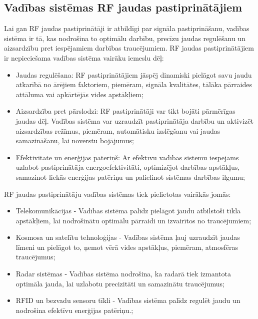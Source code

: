 \subsection{Vadības sistēmas RF jaudas pastiprinātājiem}
Lai gan RF jaudas pastiprinātāji ir atbildīgi par signāla pastiprināšanu, vadības sistēma ir tā, kas nodrošina to optimālu darbību, precīzu jaudas regulēšanu un aizsardzību pret iespējamiem darbības traucējumiem.
RF jaudas pastiprinātājiem ir nepieciešama vadības sistēma vairāku iemeslu dēļ:
\begin{itemize}
    \item Jaudas regulēšana: RF pastiprinātājiem jāspēj dinamiski pielāgot savu jaudu atkarībā no ārējiem faktoriem, piemēram, signāla kvalitātes, tālāka pārraides attāluma vai apkārtējās vides apstākļiem;
    \item Aizsardzība pret pārslodzi: RF pastiprinātāji var tikt bojāti pārmērīgas jaudas dēļ. Vadības sistēma var uzraudzīt pastiprinātāja darbību un aktivizēt aizsardzības režīmus, piemēram, automātisku izslēgšanu vai jaudas samazināšanu, lai novērstu bojājumus;
    \item Efektivitāte un enerģijas patēriņš: Ar efektīvu vadības sistēmu iespējams uzlabot pastiprinātāja energoefektivitāti, optimizējot darbības apstākļus, samazinot liekās enerģijas patēriņu un palielinot sistēmas darbības ilgumu;
\end{itemize}

RF jaudas pastiprinātāju vadības sistēmas tiek pielietotas vairākās jomās:

\begin{itemize}
    \item Telekomunikācijas - Vadības sistēma palīdz pielāgot jaudu atbilstoši tīkla apstākļiem, lai nodrošinātu optimālu pārraidi un izvairītos no traucējumiem;
    \item Kosmosa un satelītu tehnoloģijas - Vadības sistēma ļauj uzraudzīt jaudas līmeni un pielāgot to, ņemot vērā vides apstākļus, piemēram, atmosfēras traucējumus;
    \item Radar sistēmas - Vadības sistēma nodrošina, ka radarā tiek izmantota optimāla jauda, lai uzlabotu precizitāti un samazinātu traucējumus;
    \item RFID un bezvadu sensoru tīkli - Vadības sistēma palīdz regulēt jaudu un nodrošina efektīvu enerģijas patēriņu.;
\end{itemize}

